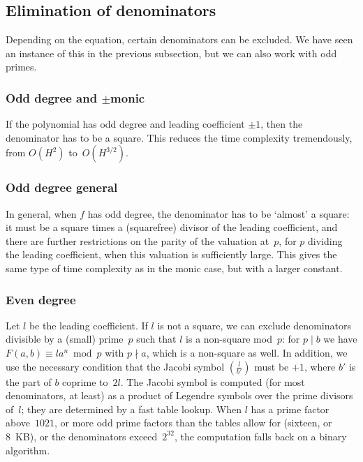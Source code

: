 \documentclass[12pt,a4paper,oneside]{amsart}
\begin{document}
\subsection{Elimination of denominators}

Depending on the equation, certain denominators can be excluded. We have
seen an instance of this in the previous subsection, but we can also work
with odd primes.

\subsubsection{Odd degree and $\pm$monic}

If the polynomial has odd degree and leading coefficient $\pm 1$, then
the denominator has to be a square. This reduces the time complexity
tremendously, from $O(H^2)$ to~$O(H^{3/2})$.

\subsubsection{Odd degree general}

In general, when $f$ has odd degree, the denominator has to be `almost'
a square: it must be a square times a (squarefree) divisor of the leading
coefficient, and there are further restrictions on the parity of the
valuation at~$p$, for $p$ dividing the leading coefficient, when this
valuation is sufficiently large. This gives the same type of time complexity
as in the monic case, but with a larger constant.

\subsubsection{Even degree} \label{sec:elim}

Let $l$ be the leading coefficient. If $l$ is not a square, we can exclude
denominators divisible by a (small) prime~$p$ such that $l$ is a non-square
mod~$p$: for $p \mid b$ we have $F(a,b) \equiv l a^n \bmod p$ with $p \nmid
a$, which is a non-square as well. In addition, we use the necessary
condition that the Jacobi symbol $\left(\frac{l}{b'}\right)$ must be $+1$,
where $b'$ is the part of $b$ coprime to~$2l$. The Jacobi symbol
is computed (for most denominators, at least) as a product
of Legendre symbols over the prime divisors of~$l$; they are determined
by a fast table lookup. When $l$ has a prime factor above~$1021$, or more odd
prime factors than the tables allow for (sixteen, or 8~KB), or the
denominators exceed~$2^{32}$, the computation falls back on a binary algorithm.
\end{document}
